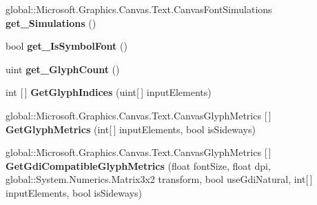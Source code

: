 \begin{DoxyCompactItemize}
\item 
\mbox{\label{class_microsoft_1_1_graphics_1_1_canvas_1_1_text_1_1_canvas_font_face_a7bf364f1333383bc69a0842a1125fb2c}} 
global\+::\+Microsoft.\+Graphics.\+Canvas.\+Text.\+Canvas\+Font\+Simulations {\bfseries get\+\_\+\+Simulations} ()
\item 
\mbox{\label{class_microsoft_1_1_graphics_1_1_canvas_1_1_text_1_1_canvas_font_face_af9103d1b0db67fda2152dc0e75de08e1}} 
bool {\bfseries get\+\_\+\+Is\+Symbol\+Font} ()
\item 
\mbox{\label{class_microsoft_1_1_graphics_1_1_canvas_1_1_text_1_1_canvas_font_face_a6dd472c2eddd38d45da02d00fe011262}} 
uint {\bfseries get\+\_\+\+Glyph\+Count} ()
\item 
\mbox{\label{class_microsoft_1_1_graphics_1_1_canvas_1_1_text_1_1_canvas_font_face_a64925916b214b05be4dc5ea2f0f36e22}} 
int \mbox{[}$\,$\mbox{]} {\bfseries Get\+Glyph\+Indices} (uint\mbox{[}$\,$\mbox{]} input\+Elements)
\item 
\mbox{\label{class_microsoft_1_1_graphics_1_1_canvas_1_1_text_1_1_canvas_font_face_a95efbe626a205b8c52231115d87a0503}} 
global\+::\+Microsoft.\+Graphics.\+Canvas.\+Text.\+Canvas\+Glyph\+Metrics \mbox{[}$\,$\mbox{]} {\bfseries Get\+Glyph\+Metrics} (int\mbox{[}$\,$\mbox{]} input\+Elements, bool is\+Sideways)
\item 
\mbox{\label{class_microsoft_1_1_graphics_1_1_canvas_1_1_text_1_1_canvas_font_face_a1b05acf54fbdfa65595101a674ac91e1}} 
global\+::\+Microsoft.\+Graphics.\+Canvas.\+Text.\+Canvas\+Glyph\+Metrics \mbox{[}$\,$\mbox{]} {\bfseries Get\+Gdi\+Compatible\+Glyph\+Metrics} (float font\+Size, float dpi, global\+::\+System.\+Numerics.\+Matrix3x2 transform, bool use\+Gdi\+Natural, int\mbox{[}$\,$\mbox{]} input\+Elements, bool is\+Sideways)
\item 
\mbox{\label{class_microsoft_1_1_graphics_1_1_canvas_1_1_text_1_1_canvas_font_face_a3dbdf29754774dbe205e03e259a56b5d}} 

\end{DoxyCompactItemize}
